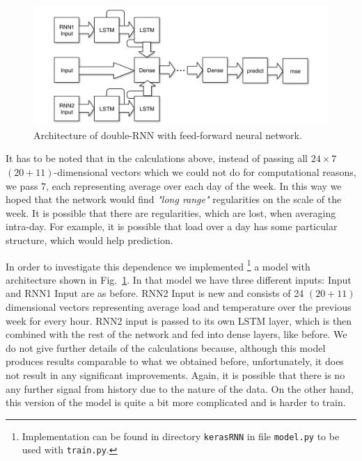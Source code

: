 \documentclass{article} %
\begin{document}
\begin{figure}[h]
\begin{center}
\includegraphics[width=1\linewidth]{energy_RNN2_diag.pdf}	
\end{center}
\caption{Architecture of double-RNN with feed-forward neural network.}
\label{fig:energy/rnn2_diag}
\end{figure}
It has to be noted that in the calculations above, instead of passing all $24\times7$ $(20+11)$-dimensional vectors which we could not do for computational reasons,
we  pass $7$, each representing average over each day of the week.
In this way we hoped that the network would find {\it "long range"}
regularities on the scale of the week. It is possible that there are
regularities, which are lost, when averaging intra-day. For example,
it is possible that load over a day has some particular structure,
which would help prediction.


In order to investigate this dependence we implemented%
\footnote{
Implementation can be found in directory {\tt kerasRNN} in file
{\tt model.py} to be used with {\tt train.py}.
}
a model with architecture shown in Fig.~\ref{fig:energy/rnn2_diag}.
In that model we have three different inputs: Input and RNN1 Input
are as before. RNN2 Input is new and consists of 24 $(20+11)$ dimensional 
vectors representing average load and temperature over the previous week 
for every hour. RNN2 input is passed to its own LSTM layer, which is 
then combined with the rest of the network and fed into dense layers,
like before.
We do not give further details of the calculations because, although
this model produces results comparable to what we obtained before, 
unfortunately, it does not result in any significant improvements.
Again, it is possible that there is no any further signal from history
due to the nature of the data. On the other hand, this version of the model
is quite a bit more complicated and is harder to train.
\end{document}
